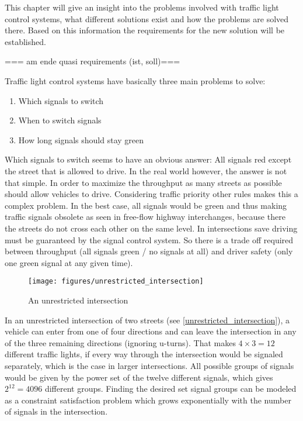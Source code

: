 This chapter will give an insight into the problems involved with traffic light control systems, what different solutions exist and how the problems are solved there. Based on this information the requirements for the new solution will be established.

=== am ende quasi requirements (ist, soll)===

Traffic light control systems have basically three main problems to solve:

\begin{enumerate}
	\item Which signals to switch
	\item When to switch signals
	\item How long signals should stay green
\end{enumerate}

Which signals to switch seems to have an obvious answer: All signals red except the street that is allowed to drive. In the real world however, the answer is not that simple. In order to maximize the throughput as many streets as possible should allow vehicles to drive. Considering traffic priority other rules makes this a complex problem. In the best case, all signals would be green and thus making traffic signals obsolete as seen in free-flow highway interchanges, because there the streets do not cross each other on the same level. In intersections save driving must be guaranteed by the signal control system. So there is a trade off required between throughput (all signals green / no signals at all) and driver safety (only one green signal at any given time). \cite{intersection_collision_avoidance}

\begin{figure}[ht]
	\centering
	\texttt{[image: figures/unrestricted\_intersection]}
	\caption{An unrestricted intersection}
	\label{unrestricted_intersection}
\end{figure}

In an unrestricted intersection of two streets (see \autoref{unrestricted_intersection}), a vehicle can enter from one of four directions and can leave the intersection in any of the three remaining directions (ignoring u-turns). That makes $4 \times 3 = 12$ different traffic lights, if every way through the intersection would be signaled separately, which is the case in larger intersections. All possible groups of signals would be given by the power set of the twelve different signals, which gives $2^{12} = 4096$ different groups. Finding the desired set signal groups can be modeled as a constraint satisfaction problem which grows exponentially with the number of signals in the intersection.

